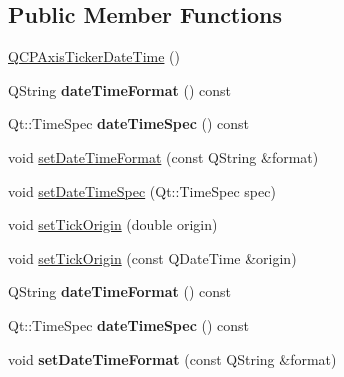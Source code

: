 \subsection*{Public Member Functions}
\begin{DoxyCompactItemize}
\item 
\hyperlink{class_q_c_p_axis_ticker_date_time_a84cc5c6bbc7c99c1f9bd4b3a392e1b9d}{Q\+C\+P\+Axis\+Ticker\+Date\+Time} ()
\item 
Q\+String {\bfseries date\+Time\+Format} () const \hypertarget{class_q_c_p_axis_ticker_date_time_a19d4302f3d58b5c05e7e943c6e7c5b57}{}\label{class_q_c_p_axis_ticker_date_time_a19d4302f3d58b5c05e7e943c6e7c5b57}

\item 
Qt\+::\+Time\+Spec {\bfseries date\+Time\+Spec} () const \hypertarget{class_q_c_p_axis_ticker_date_time_a231ff3f1e970255bf874b50fd742ff18}{}\label{class_q_c_p_axis_ticker_date_time_a231ff3f1e970255bf874b50fd742ff18}

\item 
void \hyperlink{class_q_c_p_axis_ticker_date_time_ad52660a82f688395468674d555f6a86b}{set\+Date\+Time\+Format} (const Q\+String \&format)
\item 
void \hyperlink{class_q_c_p_axis_ticker_date_time_afbd987c7197e42ab61e67fb1c38abebc}{set\+Date\+Time\+Spec} (Qt\+::\+Time\+Spec spec)
\item 
void \hyperlink{class_q_c_p_axis_ticker_date_time_a5388e048cbd32cf1ba730b9f1859eb5c}{set\+Tick\+Origin} (double origin)
\item 
void \hyperlink{class_q_c_p_axis_ticker_date_time_a2ea905872b8171847a49a5e093fb0c48}{set\+Tick\+Origin} (const Q\+Date\+Time \&origin)
\item 
Q\+String {\bfseries date\+Time\+Format} () const \hypertarget{class_q_c_p_axis_ticker_date_time_a19d4302f3d58b5c05e7e943c6e7c5b57}{}\label{class_q_c_p_axis_ticker_date_time_a19d4302f3d58b5c05e7e943c6e7c5b57}

\item 
Qt\+::\+Time\+Spec {\bfseries date\+Time\+Spec} () const \hypertarget{class_q_c_p_axis_ticker_date_time_a231ff3f1e970255bf874b50fd742ff18}{}\label{class_q_c_p_axis_ticker_date_time_a231ff3f1e970255bf874b50fd742ff18}

\item 
void {\bfseries set\+Date\+Time\+Format} (const Q\+String \&format)\hypertarget{class_q_c_p_axis_ticker_date_time_ad52660a82f688395468674d555f6a86b}{}\label{class_q_c_p_axis_ticker_date_time_ad52660a82f688395468674d555f6a86b}


\end{DoxyCompactItemize}
